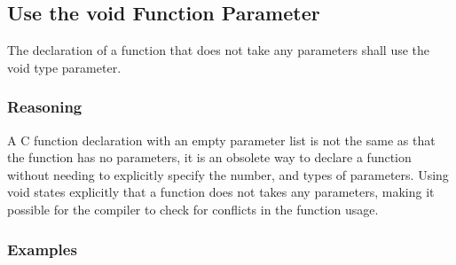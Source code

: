 \subsection{Use the void Function Parameter}

The declaration of a function that does not take any parameters shall use the void type parameter.

\subsubsection{Reasoning}

A C function declaration with an empty parameter list is not the same as that the function has no parameters, it is an obsolete way to declare a function without needing to explicitly specify the number, and types of parameters. Using void states explicitly that a function does not takes any parameters, making it possible for the compiler to check for conflicts in the function usage.

\subsubsection{Examples}

\begin{minipage}[t]{0.47\linewidth}

\end{minipage}
\hfill
\begin{minipage}[t]{0.47\linewidth}

\end{minipage}
